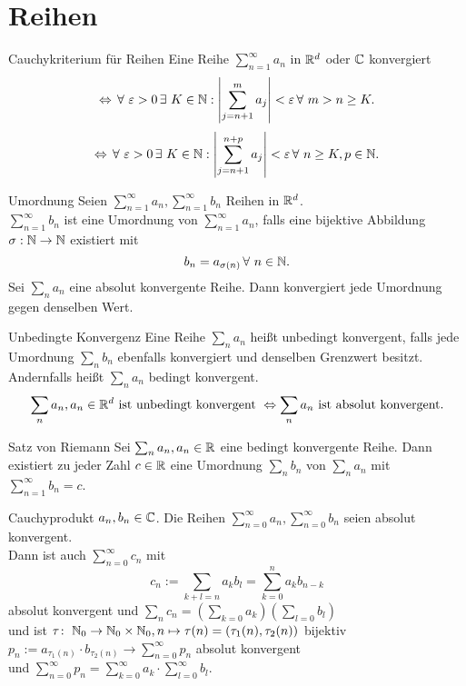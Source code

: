 \documentclass[main.tex]{subfiles}
\begin{document}
\section*{Reihen}
\begin{karte}{Cauchykriterium für Reihen}
    Eine Reihe \( \sum_{n=1}^\infty a_n \) 
    in \( \mathbb{R}^d \) oder \( \mathbb{C} \) konvergiert
    \[ \Leftrightarrow \, \forall \, 
    \varepsilon > 0 \,\exists \, K\in\N: 
    \abs{\sum_{j=n+1}^m a_j } < \varepsilon 
    \,\forall \, m>n\geq K. \]
    \[ \Leftrightarrow \, \forall \, 
    \varepsilon > 0 \,\exists \, K\in\N: 
    \abs{\sum_{j=n+1}^{n+p} a_j } < \varepsilon 
    \,\forall \, n\geq K, p\in\N. \]
\end{karte}
\begin{karte}{Umordnung}
    Seien \( \sum_{n=1}^\infty a_n, 
    \sum_{n=1}^\infty b_n \) Reihen 
    in \( \mathbb{R}^d \). \\
    \( \sum_{n=1}^\infty b_n \) 
    ist eine Umordnung von 
    \( \sum_{n=1}^\infty a_n \), falls eine 
    bijektive Abbildung \\
    \( \sigma:\mathbb{N}\rightarrow\mathbb{N} \) 
    existiert mit
    \[ b_n = a_{\sigma(n)} \,\forall \, n\in\N. \]
    Sei \( \sum_n a_n \) eine absolut konvergente Reihe. 
    Dann konvergiert jede Umordnung gegen denselben Wert.
\end{karte}
\begin{karte}{Unbedingte Konvergenz}
    Eine Reihe \( \sum_n a_n \) heißt unbedingt konvergent, 
    falls jede Umordnung \( \sum_n b_n \) ebenfalls 
    konvergiert und denselben Grenzwert besitzt. 
    Andernfalls heißt \( \sum_n a_n \) bedingt konvergent.
    \[ \sum_n a_n, a_n \in\mathbb{R}^d \text{ ist unbedingt konvergent } 
    \Leftrightarrow \sum_n a_n \text{ ist absolut konvergent.} \]
\end{karte}
\begin{karte}{Satz von Riemann}
    Sei \( \sum_n a_n, a_n \in\mathbb{R} \) eine bedingt konvergente 
    Reihe. Dann existiert zu jeder Zahl \( c\in\mathbb{R} \) eine 
    Umordnung \( \sum_n b_n \) von \( \sum_n a_n \) mit 
    \( \sum_{n=1}^\infty b_n = c \).
\end{karte}
\begin{karte}{Cauchyprodukt}
    \( a_n, b_n \in\mathbb{C} \). Die Reihen 
    \( \sum_{n=0}^\infty a_n, \sum_{n=0}^\infty b_n \) 
    seien absolut konvergent.\\
    Dann ist auch \( \sum_{n=0}^\infty c_n \) mit 
    \[ c_n := \sum_{k+l=n} a_k b_l = \sum_{k=0}^n a_k b_{n-k} \]
    absolut konvergent und \( \sum_n c_n 
    = ( \sum_{k=0} a_k )( \sum_{l=0} b_l ) \) \\
    und ist \(\tau \colon \; \mathbb{N}_0 \rightarrow \mathbb{N}_0 \times \mathbb{N}_0, 
    n \mapsto \tau(n) = (\tau_1(n), \tau_2(n)) \) bijektiv
    \( p_n := a_{\tau_1(n)} \cdot b_{\tau_2(n)} \rightarrow 
    \sum_{n=0}^\infty p_n \) absolut konvergent \\
    und \( \sum_{n=0}^\infty p_n = \sum_{k=0}^\infty 
    a_k \cdot \sum_{l=0}^\infty b_l \).
\end{karte}
\end{document}
